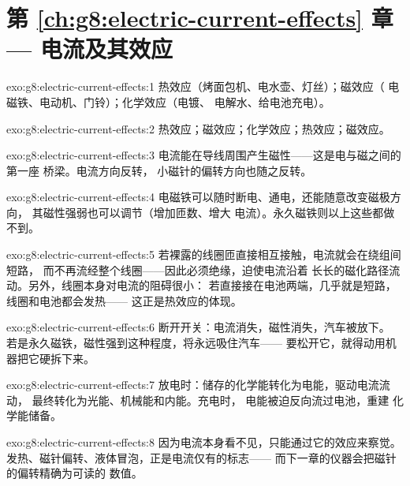 \section*{第 \ref{ch:g8:electric-current-effects} 章 --- 电流及其效应}

\begin{solution}{exo:g8:electric-current-effects:1}
热效应（烤面包机、电水壶、灯丝）；磁效应（
电磁铁、电动机、门铃）；化学效应（电镀、
电解水、给电池充电）。
\end{solution}

\begin{solution}{exo:g8:electric-current-effects:2}
热效应；磁效应；化学效应；热效应；磁效应。
\end{solution}

\begin{solution}{exo:g8:electric-current-effects:3}
电流能在导线周围产生磁性——这是电与磁之间的第一座
桥梁。电流方向反转，
小磁针的偏转方向也随之反转。
\end{solution}

\begin{solution}{exo:g8:electric-current-effects:4}
电磁铁可以随时断电、通电，还能随意改变磁极方向，
其磁性强弱也可以调节（增加匝数、增大
电流）。永久磁铁则以上这些都做不到。
\end{solution}

\begin{solution}{exo:g8:electric-current-effects:5}
若裸露的线圈匝直接相互接触，电流就会在绕组间短路，
而不再流经整个线圈——因此必须绝缘，迫使电流沿着
长长的磁化路径流动。另外，线圈本身对电流的阻碍很小：
若直接接在电池两端，几乎就是短路，线圈和电池都会发热——
这正是热效应的体现。
\end{solution}

\begin{solution}{exo:g8:electric-current-effects:6}
断开开关：电流消失，磁性消失，汽车被放下。
若是永久磁铁，磁性强到这种程度，将永远吸住汽车——
要松开它，就得动用机器把它硬拆下来。
\end{solution}

\begin{solution}{exo:g8:electric-current-effects:7}
放电时：储存的化学能转化为电能，驱动电流流动，
最终转化为光能、机械能和内能。充电时，
电能被迫反向流过电池，重建
化学能储备。
\end{solution}

\begin{solution}{exo:g8:electric-current-effects:8}
因为电流本身看不见，只能通过它的效应来察觉。
发热、磁针偏转、液体冒泡，正是电流仅有的标志——
而下一章的仪器会把磁针的偏转精确为可读的
数值。
\end{solution}

